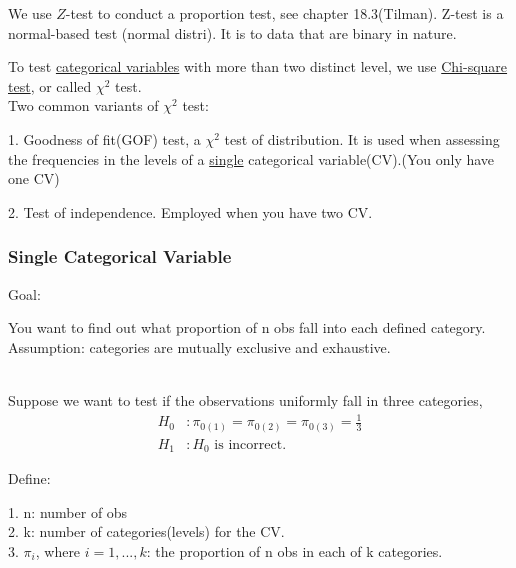 \documentclass[12pt]{article}
\begin{document}
We use $ Z $-test to conduct a proportion test,
see chapter 18.3(Tilman). Z-test is a normal-based test (normal distri).
It is to data that are binary in nature.

To test {\underline {categorical variables}} with more than two
distinct level, we use {\underline {Chi-square test}}, or called
$ \chi^{2} $ test.\\


Two common variants of $ \chi^{2} $ test: 

1. Goodness of fit(GOF) test, a $ \chi^{2} $ test of distribution.
It is used when assessing the frequencies in the levels of a 
{\underline {single}} categorical variable(CV).(You only have one CV)


2. Test of independence. Employed when you have two CV.




\subsubsection{Single Categorical Variable}
Goal:

You want to find out what proportion of n obs fall into each defined
category.\\

Assumption: categories are mutually exclusive and exhaustive.

\noindent{}\\


Suppose we want to test if the observations uniformly fall in three
categories, 
\begin{align*}
		H_0&: \pi_{0(1)} = \pi_{0(2)} = \pi_{0(3)} = \frac{1}{3}\\
		H_1&: H_0 \text{ is incorrect. }
\end{align*}





Define:

1. n: number of obs\\
2. k: number of categories(levels) for the CV.\\
3. $ \pi_{i}$, where $ i = 1, ..., k $: the proportion of n obs in each
of k categories.\\
\noindent{}\\
\end{document}
